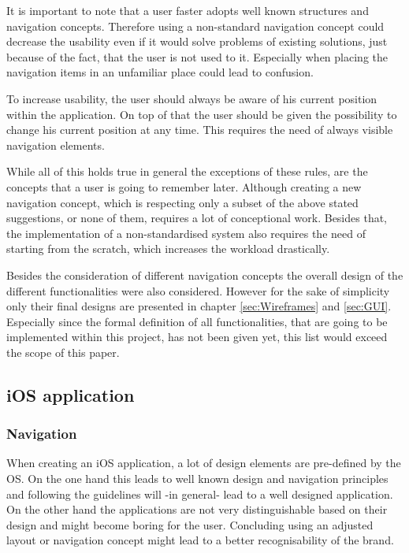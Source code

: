 It is important to note that a user faster adopts well known structures and navigation concepts. Therefore using a non-standard navigation concept could decrease the usability even if it would solve problems of existing solutions, just because of the fact, that the user is not used to it. Especially when placing the navigation items in an unfamiliar place could lead to confusion. \cite{Crestodina:2015aa}

To increase usability, the user should always be aware of his current position within the application. On top of that the user should be given the possibility to change his current position at any time. This requires the need of always visible navigation elements. 

While all of this holds true in general the exceptions of these rules, are the concepts that a user is going to remember later. Although creating a new navigation concept, which is respecting only a subset of the above stated suggestions, or none of them, requires a lot of conceptional work. Besides that, the implementation of a non-standardised system also requires the need of starting from the scratch, which increases the workload drastically. \cite{Hampton-Smith:2013aa}

Besides the consideration of different navigation concepts the overall design of the different functionalities were also considered. However for the sake of simplicity only their final designs are presented in chapter \vref{sec:Wireframes} and \vref{sec:GUI}. Especially since the formal definition of all functionalities, that are going to be implemented within this project, has not been given yet, this list would exceed the scope of this paper.

\subsection{iOS application}
\label{sec:UIConceptiOS}
\subsubsection{Navigation}
When creating an iOS application, a lot of design elements are pre-defined by the \gls{OS}. On the one hand this leads to well known design and navigation principles and following the guidelines will -in general- lead to a well designed application. On the other hand the applications are not very distinguishable based on their design and might become boring for the user. Concluding using an adjusted layout or navigation concept might lead to a better recognisability of the brand. 

